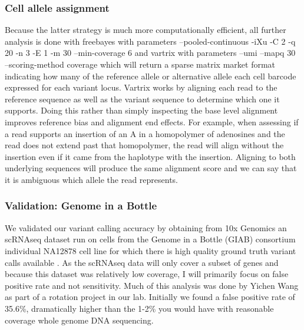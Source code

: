 \subsubsection{Cell allele assignment}
\par{
Because the latter strategy is much more computationally efficient, all further analysis is done with freebayes with parameters --pooled-continuous -iXu -C 2 -q 20 -n 3 -E 1 -m 30 --min-coverage 6 and vartrix with parameters  --umi --mapq 30 --scoring-method coverage which will return a sparse matrix market format indicating how many of the reference allele or alternative allele each cell barcode expressed for each variant locus. Vartrix works by aligning each read to the reference sequence as well as the variant sequence to determine which one it supports. Doing this rather than simply inspecting the base level alignment improves reference bias and alignment end effects. For example, when assessing if a read supports an insertion of an A in a homopolymer of adenosines and the read does not extend past that homopolymer, the read will align without the insertion even if it came from the haplotype with the insertion. Aligning to both underlying sequences will produce the same alignment score and we can say that it is ambiguous which allele the read represents.
}
\subsubsection{Validation: Genome in a Bottle}
\par{
We validated our variant calling accuracy by obtaining from 10x Genomics an scRNAseq dataset run on cells from the Genome in a Bottle (GIAB) consortium individual NA12878 cell line for which there is high quality ground truth variant calls available \cite{giab}. As the scRNAseq data will only cover a subset of genes and because this dataset was relatively low coverage, I will primarily focus on false positive rate and not sensitivity. Much of this analysis was done by Yichen Wang as part of a rotation project in our lab. Initially we found a false positive rate of 35.6\%, dramatically higher than the 1-2\% you would have with reasonable coverage whole genome DNA sequencing.
}


